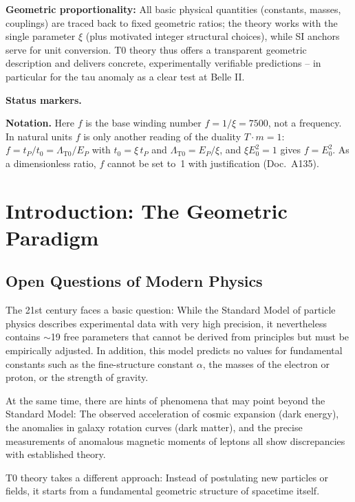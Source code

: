 		\textbf{Geometric proportionality:} All basic physical quantities (constants, masses, couplings) are traced back to fixed geometric ratios; the theory works with the single parameter $\xi$ (plus motivated integer structural choices), while SI anchors serve for unit conversion. T0 theory thus offers a transparent geometric description and delivers concrete, experimentally verifiable predictions -- in particular for the tau anomaly as a clear test at Belle II.

	\medskip\noindent\textbf{Status markers.}
	

	\medskip\noindent\textbf{Notation.} Here $f$ is the base winding number $f = 1/\xi = 7500$, not a frequency. In natural units $f$ is only another reading of the duality $T\cdot m = 1$: $f = t_P/t_0 = \Lambda_{\text{T0}}/E_P$ with $t_0 = \xi\,t_P$ and $\Lambda_{\text{T0}} = E_P/\xi$, and $\xi E_0^2 = 1$ gives $f = E_0^2$. As a dimensionless ratio, $f$ cannot be set to~1 with justification (Doc.~A135).

	
	
	
	\section{Introduction: The Geometric Paradigm}
	
	\subsection{Open Questions of Modern Physics}
	
	The 21st century faces a basic question: While the Standard Model of particle physics describes experimental data with very high precision, it nevertheless contains $\sim$19 free parameters that cannot be derived from principles but must be empirically adjusted. In addition, this model predicts no values for fundamental constants such as the fine-structure constant \(\alpha\), the masses of the electron or proton, or the strength of gravity.
	
	At the same time, there are hints of phenomena that may point beyond the Standard Model: The observed acceleration of cosmic expansion (dark energy), the anomalies in galaxy rotation curves (dark matter), and the precise measurements of anomalous magnetic moments of leptons all show discrepancies with established theory.
	
	T0 theory takes a different approach: Instead of postulating new particles or fields, it starts from a fundamental geometric structure of spacetime itself.
	
